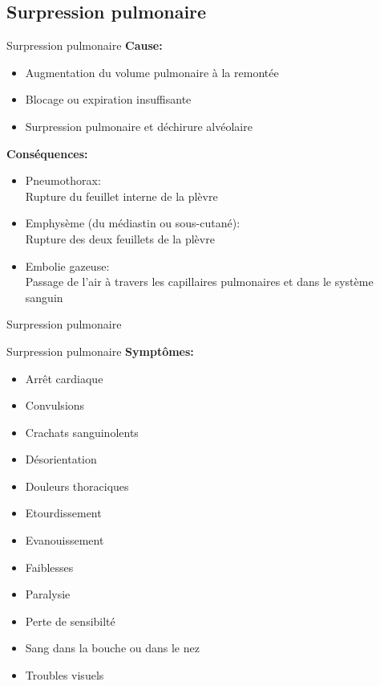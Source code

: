 \subsection{Surpression pulmonaire}

\begin{frame}{Surpression pulmonaire}
	\textbf{Cause:}
	\begin{itemize}
		\item Augmentation du volume pulmonaire à la remontée
		\item Blocage ou expiration insuffisante
		\item Surpression pulmonaire et déchirure alvéolaire
	\end{itemize}
	\vfill
	\textbf{Conséquences:}
	\begin{itemize}
		\item Pneumothorax:\\Rupture du feuillet interne de la plèvre
		\item Emphysème (du médiastin ou sous-cutané):\\Rupture des deux feuillets de la plèvre
		\item Embolie gazeuse:\\Passage de l'air à travers les capillaires pulmonaires et dans le système sanguin
	\end{itemize}
\end{frame}
	
\begin{frame}{Surpression pulmonaire}
\end{frame}

\begin{frame}{Surpression pulmonaire}  
	\textbf{Symptômes:}
	\begin{multicols}{2}
		\begin{itemize}
			\item Arrêt cardiaque
			\item Convulsions
			\item Crachats sanguinolents
			\item Désorientation
			\item Douleurs thoraciques
			\item Etourdissement
			\item Evanouissement
			\item Faiblesses
			\item Paralysie
			\item Perte de sensibilté
			\item Sang dans la bouche ou dans le nez
			\item Troubles visuels
		\end{itemize}
	\end{multicols}
\end{frame}

